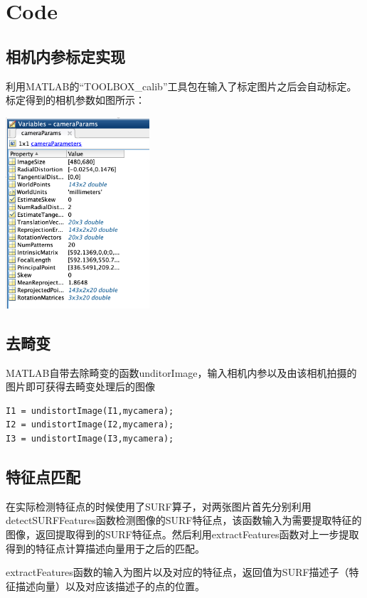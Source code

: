 \chapter{Code}
\label{chap: Code}

\section{相机内参标定实现}
利用MATLAB的“TOOLBOX\_calib”工具包在输入了标定图片之后会自动标定。标定得到的相机参数如图所示：

\begin{center}
    \includegraphics[width=0.4\textwidth]{figures/camera.png}
\end{center}

\section{去畸变}
MATLAB自带去除畸变的函数unditorImage，输入相机内参以及由该相机拍摄的图片即可获得去畸变处理后的图像

\begin{lstlisting}
I1 = undistortImage(I1,mycamera);
I2 = undistortImage(I2,mycamera);
I3 = undistortImage(I3,mycamera);
\end{lstlisting}


\section{特征点匹配}
在实际检测特征点的时候使用了SURF算子，对两张图片首先分别利用detectSURFFeatures函数检测图像的SURF特征点，该函数输入为需要提取特征的图像，返回提取得到的SURF特征点。然后利用extractFeatures函数对上一步提取得到的特征点计算描述向量用于之后的匹配。

extractFeatures函数的输入为图片以及对应的特征点，返回值为SURF描述子（特征描述向量）以及对应该描述子的点的位置。

